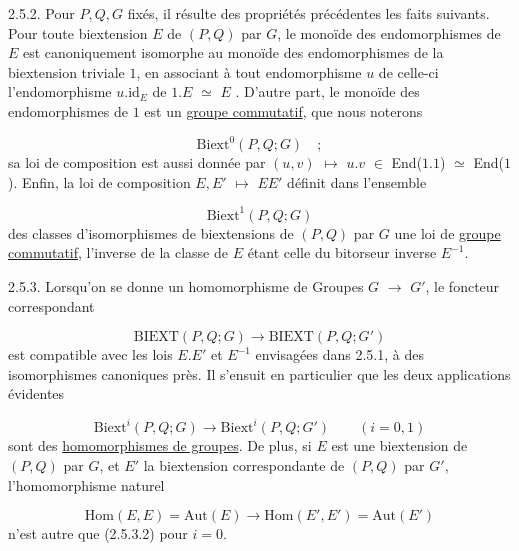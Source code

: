 
2.5.2. Pour $P, Q, G$ fixés, il résulte des propriétés précédentes les faits suivants. Pour toute biextension $E$ de $(P,Q)$ par $G$, le monoïde des endomorphismes de $E$ est canoniquement isomorphe au monoïde des endomorphismes de la biextension triviale \underline{$1$}, en associant à tout endomorphisme $u$ de celle-ci l'endomorphisme $u$.id$_{E}$ de \underline{$1$}.$E$ $\simeq$ $E$ . D'autre part, le monoïde des endomorphismes de \underline{$1$} est un \underline{groupe commutatif}, que nous noterons

\begin{equation}\tag{2.5.2.1}
\mathrm{Biext}^{0}(P,Q;G) \quad ;
\end{equation}
sa loi de composition est aussi donnée par $(u,v)$ $\longmapsto$ $u.v$ $\in$ End(\underline{$1$}.\underline{$1$}) $\simeq$ End(\underline{$1$}). Enfin, la loi de composition $E,E'$ $\longmapsto$ $EE'$ définit dans l'ensemble

\begin{equation}\tag{2.5.2.2}
\mathrm{Biext}^{1}(P,Q;G)
\end{equation}
des classes d'isomorphismes de biextensions de $(P,Q)$ par $G$ une loi de \underline{groupe commutatif}, l'inverse de la classe de $E$ étant celle du bitorseur inverse $E^{-1}$.

2.5.3. Lorsqu'on se donne un homomorphisme de Groupes $G$ $\longrightarrow$ $G'$, le foncteur correspondant

\begin{equation}\tag{2.5.3.1}
\mathrm{BIEXT}(P,Q;G) \longrightarrow \mathrm{BIEXT}(P,Q;G')
\end{equation}
est compatible avec les lois $E.E'$ et $E^{-1}$ envisagées dans 2.5.1, à des isomorphismes canoniques près. Il s'ensuit en particulier que les deux applications évidentes

\begin{equation}\tag{2.5.3.2}
\mathrm{Biext}^{i}(P,Q;G) \longrightarrow \mathrm{Biext}^{i}(P,Q;G') \qquad (i=0,1)
\end{equation}
sont des \underline{homomorphismes de groupes}. De plus, si $E$ est une biextension de $(P,Q)$ par $G$, et $E'$ la biextension correspondante de $(P,Q)$ par $G'$, l'homomorphisme naturel

\begin{equation}\tag{2.5.3.3}
\mathrm{Hom}(E,E) = \mathrm{Aut}(E) \longrightarrow \mathrm{Hom}(E',E') = \mathrm{Aut}(E')
\end{equation}
n'est autre que (2.5.3.2) pour $i = 0$.

